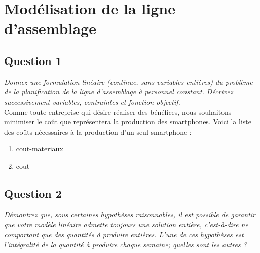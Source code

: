\documentclass[10pt, a4, oneside, headings=normal]{scrreprt}
\begin{document}

\tableofcontents

\section{Modélisation de la ligne d'assemblage}
\subsection{Question 1}
\emph{Donnez une formulation linéaire (continue, sans variables entières) du problème de la planification de la ligne d'assemblage à personnel constant. Décrivez successivement variables,
contraintes et fonction objectif.}
\\

Comme toute entreprise qui désire réaliser des bénéfices, nous souhaitons minimiser le coût que représentera la production des smartphones.
Voici la liste des coûts nécessaires à la production d'un seul smartphone :
\begin{enumerate}
\item cout-materiaux
\item cout
\end{enumerate}

\subsection{Question 2}
\emph{Démontrez que, sous certaines hypothèses raisonnables, il est possible de garantir que votre modèle linéaire admette toujours une solution entière, c'est-à-dire ne comportant que des quantités à produire entières. L'une de ces hypothèses est l'intégralité de la quantité à produire chaque semaine; quelles sont les autres ? }
\end{document}
